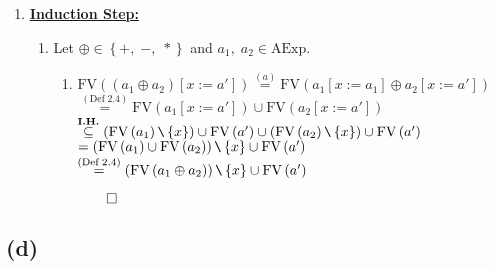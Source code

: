 \documentclass[12pt]{scrartcl}
\newcommand{\FV}{\text{FV}}
\begin{document}
\begin{enumerate}
\begin{enumerate}
		\end{enumerate}
		\item[] \underline{\textbf{Induction Step:}}
		\begin{enumerate}
			\item[] Let $\oplus\in \left\{+,\; -,\; *\right\}$ and $a_{1},\;a_{2}\in\text{AExp}$.			
			\begin{enumerate}
				\item[] $\FV\left(\left(a_{1}\oplus a_{2}\right)\left[x:=a'\right]\right)\overset{\left(a\right)}{=}\FV\left(a_{1}\left[x:=a_{1}\right]\oplus a_{2}\left[x:=a'\right]\right)$\\[6pt]
				$\overset{\left(\text{Def}\; 2.4\right)}{=}\FV\left(a_{1}\left[x:=a'\right]\right)\cup\FV\left(a_{2}\left[x:=a'\right]\right)$\\[6pt]
				$\overset{\text{\textbf{I.H.}}}{\subseteq}\left(\FV\left(a_{1}\right)\verb|\|\left\{x\right\}\right)\cup \FV\left(a'\right)\cup\left(\FV\left(a_{2}\right)\verb|\|\left\{x\right\}\right)\cup \FV\left(a'\right)$\\[6pt]
				$=\left(\FV\left(a_{1}\right)\cup\FV\left(a_{2}\right)\right)\verb|\|\left\{x\right\}\cup \FV\left(a'\right)$\\[6pt]
				$\overset{\left(\text{Def}\; 2.4\right)}{=}\left(\FV\left(a_{1}\oplus a_{2}\right)\right)\verb|\|\left\{x\right\}\cup \FV\left(a'\right)$ \begin{flushright}
				$\qed$
				\end{flushright}
			\end{enumerate}
		\end{enumerate}
	\end{enumerate}
	
	\subsection*{(d)}
	
\end{document}
